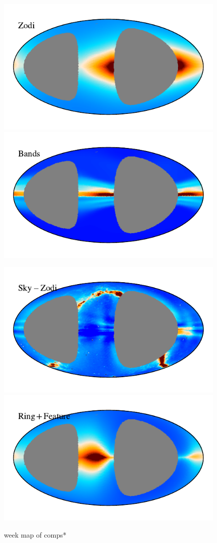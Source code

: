 \documentclass{aa}
\begin{document}
\begin{figure}
\includegraphics[width=0.88\columnwidth]{figs/zodi_comps/zodi_zodi_98_week.pdf}\includegraphics[width=0.88\columnwidth]{figs/zodi_comps/zodi_bands_98_week.pdf}
\vspace{-0.6cm}

\includegraphics[width=0.88\columnwidth]{figs/zodi_comps/zodi_res_98_week.pdf}\includegraphics[width=0.88\columnwidth]{figs/zodi_comps/zodi_ring+feature_98_week.pdf}
\caption{week map of comps*}
\label{fig: K98 week comparison}
\end{figure}
\end{document}
